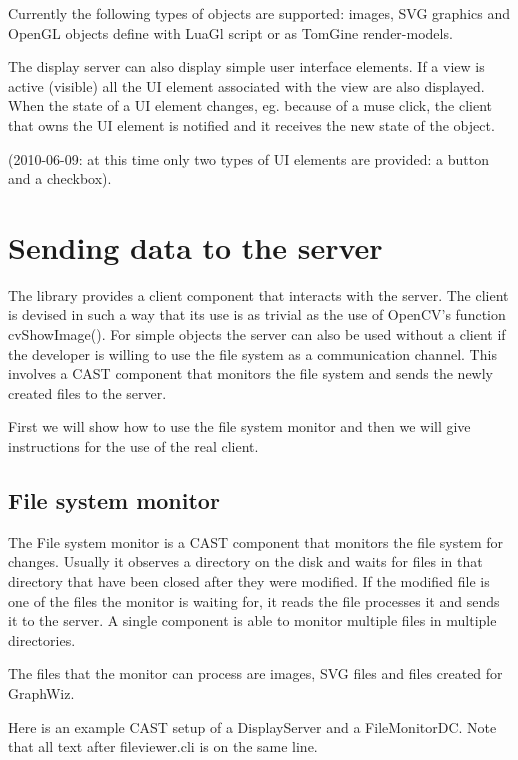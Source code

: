 Currently the following types of objects are supported: images, SVG graphics and
OpenGL objects define with LuaGl script or as TomGine render-models. 

The display server can also display simple user interface elements. If a view
is active (visible) all the UI element associated with the view are also
displayed. When the state of a UI element changes, eg.  because of a muse
click, the client that owns the UI element is notified and it receives the new
state of the object.

(2010-06-09: at this time only two types of UI elements are provided: a button
and a checkbox).

\section{Sending data to the server}

The library provides a client component that interacts with the server. The
client is devised in such a way that its use is as trivial as the use of
OpenCV's function cvShowImage(). For simple objects the server can also
be used without a client if the developer is willing to use the file system
as a communication channel. This involves a CAST component that monitors
the file system and sends the newly created files to the server.

First we will show how to use the file system monitor and then we will give
instructions for the use of the real client.

\subsection{File system monitor}

The File system monitor is a CAST component that monitors the file system for
changes. Usually it observes a directory on the disk and waits for files in that
directory that have been closed after they were modified. If the modified file
is one of the files the monitor is waiting for, it reads the file processes it
and sends it to the server. A single component is able to monitor multiple files
in multiple directories.

The files that the monitor can process are images, SVG files and files created
for GraphWiz.

Here is an example CAST setup of a DisplayServer and a FileMonitorDC. Note that
all text after fileviewer.cli is on the same line.

